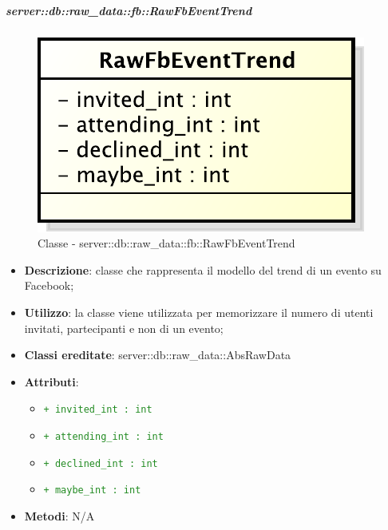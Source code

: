 			\subparagraph{server::db::raw\_data::fb::RawFbEventTrend} %
			\label{subp:server_db_raw_data_fb_rowfbeventtrend}
				\begin{figure}[htbp]
					\centering
					\centerline{\includegraphics[scale=0.75]{./images/server/classes/db/raw_fb_event_trend.pdf}}
					\caption{Classe - server::db::raw\_data::fb::RawFbEventTrend}
				\end{figure}
				\begin{itemize}
					\item \textbf{Descrizione}: classe che rappresenta il modello del trend di un evento su Facebook;
					\item \textbf{Utilizzo}: la classe viene utilizzata per memorizzare il numero di utenti invitati, partecipanti e non di un evento;
					\item \textbf{Classi ereditate}: server::db::raw\_data::AbsRawData
					\item \textbf{Attributi}:
					\begin{itemize}
						\item \textcolor{forestgreen}{\texttt{+ invited\_int : int}}
						\item \textcolor{forestgreen}{\texttt{+ attending\_int : int}}
						\item \textcolor{forestgreen}{\texttt{+ declined\_int : int}}
						\item \textcolor{forestgreen}{\texttt{+ maybe\_int : int}}
					\end{itemize}
					\item \textbf{Metodi}: N/A
				\end{itemize}
